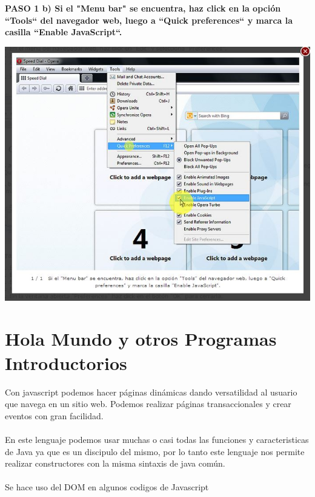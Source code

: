 \documentclass[11pt]{article} %
\begin{document}
\begin{center}
\bf PASO 1
 b) Si el "Menu bar" se encuentra, haz click en la opción ``Tools`` del navegador web, luego a ``Quick preferences`` y marca la casilla ``Enable JavaScript``.
\end{center}

\includegraphics[height=8 cm, width=8 cm] {imagenes/opera 02.JPG}
\newline
\newline




\section{Hola Mundo y otros Programas Introductorios} 

Con javascript podemos hacer páginas dinámicas dando versatilidad al usuario que navega en un sitio web. Podemos realizar páginas transaccionales y crear eventos con gran facilidad.\\

 \\

En este lenguaje podemos usar muchas o casi todas las funciones y caracteristicas de Java ya que es un discipulo del mismo, por lo tanto este lenguaje nos permite realizar constructores con la misma sintaxis de java común.\\

 \\ 

Se hace uso del DOM en algunos codigos de Javascript\\
\end{document}
